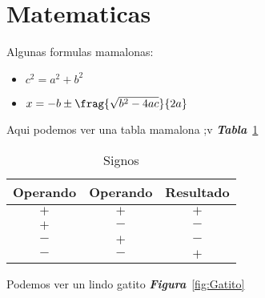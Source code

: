 \section{Matematicas}
Algunas formulas mamalonas:
\begin{itemize}
\item $c^2 = a^2 + b^2$  
\item $x = -b \pm \frag{\sqrt{b^2-4ac}}{2a}$
\end{itemize}

Aqui podemos ver una tabla mamalona ;v
\emph{\textbf{Tabla}}~\ref{tab:Signos}

\begin{table}[h]
  \centering
  \begin{tabular}{| c | c | c |}
    \hline
    Operando & Operando & Resultado\\\hline
    $+$ & $+$ & $+$\\\hline
    $+$ & $-$ & $-$\\\hline
    $-$ & $+$ & $-$\\\hline
    $-$ & $-$ & $+$\\\hline    
  \end{tabular}
  \caption{Signos}
  \label{tab:Signos}
\end{table}


Podemos ver un lindo gatito
\emph{\textbf{Figura}}~\ref{fig:Gatito}
